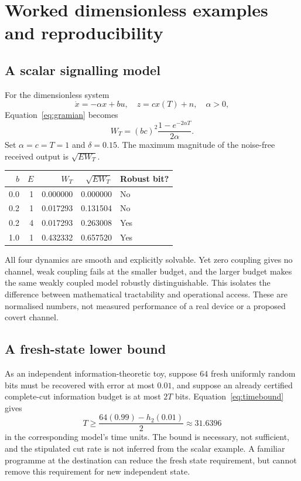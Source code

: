 \documentclass[11pt,a4paper]{article}
\theoremstyle{definition}
\theoremstyle{remark}
\begin{document}
\Needspace{0.32\textheight}
\section{Worked dimensionless examples and reproducibility}\label{app:examples}
\subsection{A scalar signalling model}
For the dimensionless system
\[
 \dot x=-\alpha x+bu,\quad z=cx(T)+n,\quad \alpha>0,
\]
Equation~\eqref{eq:gramian} becomes
\begin{equation}\label{eq:scalar}
 W_T=(bc)^2\frac{1-e^{-2\alpha T}}{2\alpha}.
\end{equation}
Set $\alpha=c=T=1$ and $\delta=0.15$. The maximum magnitude of the noise-free received output is $\sqrt{EW_T}$.
\begin{center}
\begin{tabular}{@{}rrrrl@{}}
\toprule
$b$ & $E$ & $W_T$ & $\sqrt{EW_T}$ & Robust bit?\\
\midrule
0.0 & 1 & 0.000000 & 0.000000 & No\\
0.2 & 1 & 0.017293 & 0.131504 & No\\
0.2 & 4 & 0.017293 & 0.263008 & Yes\\
1.0 & 1 & 0.432332 & 0.657520 & Yes\\
\bottomrule
\end{tabular}
\end{center}
All four dynamics are smooth and explicitly solvable. Yet zero coupling gives no channel, weak coupling fails at the smaller budget, and the larger budget makes the same weakly coupled model robustly distinguishable. This isolates the difference between mathematical tractability and operational access. These are normalised numbers, not measured performance of a real device or a proposed covert channel.

\subsection{A fresh-state lower bound}
As an independent information-theoretic toy, suppose $64$ fresh uniformly random bits must be recovered with error at most $0.01$, and suppose an already certified complete-cut information budget is at most $2T$ bits. Equation~\eqref{eq:timebound} gives
\[
 T\geq\frac{64(0.99)-h_2(0.01)}{2}\approx31.6396
\]
in the corresponding model's time units. The bound is necessary, not sufficient, and the stipulated cut rate is not inferred from the scalar example. A familiar programme at the destination can reduce the fresh state requirement, but cannot remove this requirement for new independent state.
\end{document}
